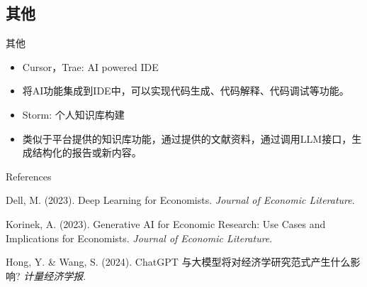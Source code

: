 \documentclass{beamer}
\begin{document}
\subsection{其他}
\begin{frame}{其他}
  \begin{itemize}
    \item Cursor，Trae: AI powered IDE
    \item 将AI功能集成到IDE中，可以实现代码生成、代码解释、代码调试等功能。
    \item Storm: 个人知识库构建
    \item 类似于平台提供的知识库功能，通过提供的文献资料，通过调用LLM接口，生成结构化的报告或新内容。
  \end{itemize}
\end{frame}

\begin{frame}{References}
  \footnotesize
  \begin{thebibliography}{10}

    Dell, M. (2023).
    \newblock Deep Learning for Economists.
    \newblock \emph{Journal of Economic Literature}.

    Korinek, A. (2023).
    \newblock Generative AI for Economic Research: Use Cases and Implications for Economists.
    \newblock \emph{Journal of Economic Literature}.

    Hong, Y. \& Wang, S. (2024).
    \newblock ChatGPT 与大模型将对经济学研究范式产生什么影响?
    \newblock \emph{计量经济学报}.

  \end{thebibliography}
\end{frame}
\end{document}
